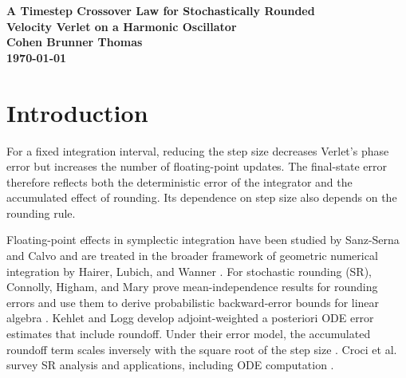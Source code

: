\documentclass[
11pt
]{article}
\begin{document}
\begin{center}
\Large\bfseries A Timestep Crossover Law for Stochastically Rounded\\
Velocity Verlet on a Harmonic Oscillator
\\[0.75em]
\normalsize Cohen Brunner Thomas\\
\today
\end{center}

\begin{abstract}

We measure velocity-Verlet error for the unit harmonic oscillator,
separating ordinary FP32 round-to-nearest from stochastic rounding. In
the direct FP32 run, RMS final-state error has a grid minimum of
\(1.13\times10^{-5}\) at \(h=1.53\times10^{-3}\) and rises by factors
2.5 and 4.4 at the next two finer steps. For stochastic rounding, we use
the exact bias and variance decomposition and a common absolute timestep
grid across durations. The grid-minimum precision exponent is
\(\hat\beta_s=0.419\), with trajectory-bootstrap 95\% interval
[0.392, 0.448], which contains the predicted \(2/5\). An asymptotic
fixed-\(B\) prediction, calibrated from \(s=10,12,20,24\) without
\(s=16\), predicts the observed grid minima at five \(s=16\) duration
conditions to within 6.1\%. The duration exponent is
\(\hat\beta_T=-0.205\), with 95\% interval \([-0.254,-0.144]\),
which contains \(-1/5\). These results support the predicted scaling for
this oscillator and implementation.

\end{abstract}

\section{Introduction}\label{introduction}

For a fixed integration interval, reducing the step size decreases
Verlet's phase error but increases the number of floating-point updates.
The final-state error therefore reflects both the deterministic error of
the integrator and the accumulated effect of rounding. Its dependence on
step size also depends on the rounding rule.

Floating-point effects in symplectic integration have been studied by
Sanz-Serna and Calvo \cite{sanz1999} and are treated in the broader framework of
geometric numerical integration by Hairer, Lubich, and Wanner \cite{hairer2006}. For
stochastic rounding (SR), Connolly, Higham, and Mary prove
mean-independence results for rounding errors and use them to derive
probabilistic backward-error bounds for linear algebra \cite{connolly2021}. Kehlet and
Logg develop adjoint-weighted a posteriori ODE error estimates that
include roundoff. Under their error model, the accumulated roundoff term
scales inversely with the square root of the step size \cite{kehlet2017}. Croci et al.
survey SR analysis and applications, including ODE computation \cite{croci2022}.
\end{document}
